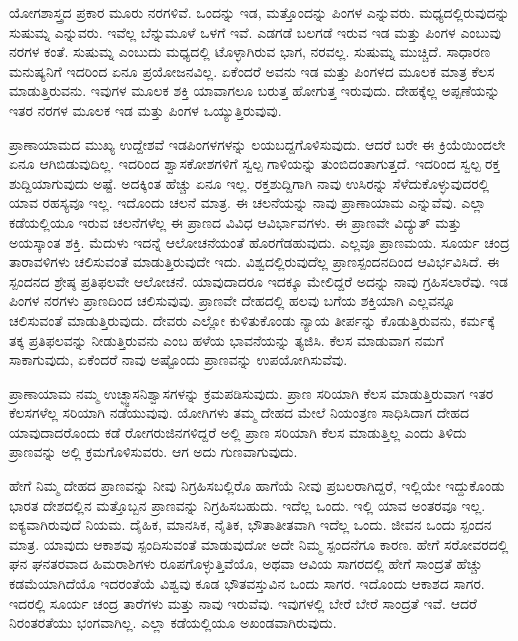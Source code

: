ಯೋಗಶಾಸ್ತ್ರದ ಪ್ರಕಾರ ಮೂರು ನರಗಳಿವೆ. ಒಂದನ್ನು ಇಡ, ಮತ್ತೊಂದನ್ನು ಪಿಂಗಳ ಎನ್ನುವರು. ಮಧ್ಯದಲ್ಲಿರುವುದನ್ನು ಸುಷುಮ್ನ ಎನ್ನುವರು. ಇವೆಲ್ಲ ಬೆನ್ನುಮೂಳೆ ಒಳಗೆ ಇವೆ. ಎಡಗಡೆ ಬಲಗಡೆ ಇರುವ ಇಡ ಮತ್ತು ಪಿಂಗಳ ಎಂಬುವು ನರಗಳ ಕಂತೆ. ಸುಷುಮ್ನ ಎಂಬುದು ಮಧ್ಯದಲ್ಲಿ ಟೊಳ್ಳಾಗಿರುವ ಭಾಗ, ನರವಲ್ಲ. ಸುಷುಮ್ನ ಮುಚ್ಚಿದೆ. ಸಾಧಾರಣ ಮನುಷ್ಯನಿಗೆ ಇದರಿಂದ ಏನೂ ಪ್ರಯೋಜನವಿಲ್ಲ. ಏಕೆಂದರೆ ಅವನು ಇಡ ಮತ್ತು ಪಿಂಗಳದ ಮೂಲಕ ಮಾತ್ರ ಕೆಲಸ ಮಾಡುತ್ತಿರುವನು. ಇವುಗಳ ಮೂಲಕ ಶಕ್ತಿ ಯಾವಾಗಲೂ ಬರುತ್ತ ಹೋಗುತ್ತ ಇರುವುದು. ದೇಹಕ್ಕೆಲ್ಲ ಅಪ್ಪಣೆಯನ್ನು ಇತರ ನರಗಳ ಮೂಲಕ ಇಡ ಮತ್ತು ಪಿಂಗಳ ಒಯ್ಯುತ್ತಿರುವುವು.

ಪ್ರಾಣಾಯಾಮದ ಮುಖ್ಯ ಉದ್ದೇಶವೆ ಇಡಪಿಂಗಳಗಳನ್ನು ಲಯಬದ್ದಗೊಳಿಸುವುದು. ಆದರೆ ಬರೇ ಈ ಕ್ರಿಯೆಯಿಂದಲೇ ಏನೂ ಆಗಿಬಿಡುವುದಿಲ್ಲ. ಇದರಿಂದ ಶ್ವಾಸಕೋಶಗಳಿಗೆ ಸ್ವಲ್ಪ ಗಾಳಿಯನ್ನು ತುಂಬಿದಂತಾಗುತ್ತದೆ. ಇದರಿಂದ ಸ್ವಲ್ಪ ರಕ್ತ ಶುದ್ದಿಯಾಗುವುದು ಅಷ್ಟೆ. ಅದಕ್ಕಿಂತ ಹೆಚ್ಚು ಏನೂ ಇಲ್ಲ. ರಕ್ತಶುದ್ದಿಗಾಗಿ ನಾವು ಉಸಿರನ್ನು ಸೆಳೆದುಕೊಳ್ಳುವುದರಲ್ಲಿ ಯಾವ ರಹಸ್ಯವೂ ಇಲ್ಲ. ಇದೊಂದು ಚಲನೆ ಮಾತ್ರ. ಈ ಚಲನೆಯನ್ನು ನಾವು ಪ್ರಾಣಾಯಾಮ ಎನ್ನುವೆವು. ಎಲ್ಲಾ ಕಡೆಯಲ್ಲಿಯೂ ಇರುವ ಚಲನೆಗಳೆಲ್ಲ ಈ ಪ್ರಾಣದ ವಿವಿಧ ಆವಿರ್ಭಾವಗಳು. ಈ ಪ್ರಾಣವೇ ವಿದ್ಯುತ್ ಮತ್ತು ಅಯಸ್ಕಾಂತ ಶಕ್ತಿ. ಮೆದುಳು ಇದನ್ನೆ ಆಲೋಚನೆಯಂತೆ ಹೊರಗೆಡಹುವುದು. ಎಲ್ಲವೂ ಪ್ರಾಣಮಯ. ಸೂರ್ಯ ಚಂದ್ರ ತಾರಾವಳಿಗಳು ಚಲಿಸುವಂತೆ ಮಾಡುತ್ತಿರುವುದೇ ಇದು. ವಿಶ್ವದಲ್ಲಿರುವುದೆಲ್ಲ ಪ್ರಾಣಸ್ಪಂದನದಿಂದ ಆವಿರ್ಭವಿಸಿದೆ. ಈ ಸ್ಪಂದನದ ಶ್ರೇಷ್ಠ ಪ್ರತಿಫಲವೇ ಆಲೋಚನೆ. ಯಾವುದಾದರೂ ಇದಕ್ಕೂ ಮೇಲಿದ್ದರೆ ಅದನ್ನು ನಾವು ಗ್ರಹಿಸಲಾರೆವು. ಇಡ ಪಿಂಗಳ ನರಗಳು ಪ್ರಾಣದಿಂದ ಚಲಿಸುವುವು. ಪ್ರಾಣವೇ ದೇಹದಲ್ಲಿ ಹಲವು ಬಗೆಯ ಶಕ್ತಿಯಾಗಿ ಎಲ್ಲವನ್ನೂ ಚಲಿಸುವಂತೆ ಮಾಡುತ್ತಿರುವುದು. ದೇವರು ಎಲ್ಲೋ ಕುಳಿತುಕೊಂಡು ನ್ಯಾಯ ತೀರ್ಪನ್ನು ಕೊಡುತ್ತಿರುವನು, ಕರ್ಮಕ್ಕೆ ತಕ್ಕ ಪ್ರತಿಫಲವನ್ನು ನೀಡುತ್ತಿರುವನು ಎಂಬ ಹಳೆಯ ಭಾವನೆಯನ್ನು ತ್ಯಜಿಸಿ. ಕೆಲಸ ಮಾಡುವಾಗ ನಮಗೆ ಸಾಕಾಗುವುದು, ಏಕೆಂದರೆ ನಾವು ಅಷ್ಟೊಂದು ಪ್ರಾಣವನ್ನು ಉಪಯೋಗಿಸುವೆವು.

ಪ್ರಾಣಾಯಾಮ ನಮ್ಮ ಉಚ್ಛ್ವಾಸನಿಶ್ವಾಸಗಳನ್ನು ಕ್ರಮಪಡಿಸುವುದು. ಪ್ರಾಣ ಸರಿಯಾಗಿ ಕೆಲಸ ಮಾಡುತ್ತಿರುವಾಗ ಇತರ ಕೆಲಸಗಳೆಲ್ಲ ಸರಿಯಾಗಿ ನಡೆಯುವುವು. ಯೋಗಿಗಳು ತಮ್ಮ ದೇಹದ ಮೇಲೆ ನಿಯಂತ್ರಣ ಸಾಧಿಸಿದಾಗ ದೇಹದ ಯಾವುದಾದರೊಂದು ಕಡೆ ರೋಗರುಜಿನಗಳಿದ್ದರೆ ಅಲ್ಲಿ ಪ್ರಾಣ ಸರಿಯಾಗಿ ಕೆಲಸ ಮಾಡುತ್ತಿಲ್ಲ ಎಂದು ತಿಳಿದು ಪ್ರಾಣವನ್ನು ಅಲ್ಲಿ ಕ್ರಮಗೊಳಿಸುವರು. ಆಗ ಅದು ಗುಣವಾಗುವುದು.

ಹೇಗೆ ನಿಮ್ಮ ದೇಹದ ಪ್ರಾಣವನ್ನು ನೀವು ನಿಗ್ರಹಿಸಬಲ್ಲಿರೊ ಹಾಗೆಯೆ ನೀವು ಪ್ರಬಲರಾಗಿದ್ದರೆ, ಇಲ್ಲಿಯೇ ಇದ್ದುಕೊಂಡು ಭಾರತ ದೇಶದಲ್ಲಿನ ಮತ್ತೊಬ್ಬನ ಪ್ರಾಣವನ್ನು ನಿಗ್ರಹಿಸಬಹುದು. ಇದೆಲ್ಲ ಒಂದು. ಇಲ್ಲಿ ಯಾವ ಅಂತರವೂ ಇಲ್ಲ. ಐಕ್ಯವಾಗಿರುವುದೆ ನಿಯಮ. ದೈಹಿಕ, ಮಾನಸಿಕ, ನೈತಿಕ, ಭೌತಾತೀತವಾಗಿ ಇದೆಲ್ಲ ಒಂದು. ಜೀವನ ಒಂದು ಸ್ಪಂದನ ಮಾತ್ರ. ಯಾವುದು ಆಕಾಶವು ಸ್ಪಂದಿಸುವಂತೆ ಮಾಡುವುದೋ ಅದೇ ನಿಮ್ಮ ಸ್ಪಂದನೆಗೂ ಕಾರಣ. ಹೇಗೆ ಸರೋವರದಲ್ಲಿ ಘನ ಘನತರವಾದ ಹಿಮರಾಶಿಗಳು ರೂಪಗೊಳ್ಳುತ್ತಿವೆಯೊ, ಅಥವಾ ಆವಿಯ ಸಾಗರದಲ್ಲಿ ಹೇಗೆ ಸಾಂದ್ರತೆ ಹೆಚ್ಚು ಕಡಮೆಯಾಗಿದೆಯೊ ಇದರಂತೆಯೆ ವಿಶ್ವವು ಕೂಡ ಭೌತವಸ್ತುವಿನ ಒಂದು ಸಾಗರ. ಇದೊಂದು ಆಕಾಶದ ಸಾಗರ. ಇದರಲ್ಲಿ ಸೂರ್ಯ ಚಂದ್ರ ತಾರೆಗಳು ಮತ್ತು ನಾವು ಇರುವೆವು. ಇವುಗಳಲ್ಲಿ ಬೇರೆ ಬೇರೆ ಸಾಂದ್ರತೆ ಇವೆ. ಆದರೆ ನಿರಂತರತೆಯು ಭಂಗವಾಗಿಲ್ಲ. ಎಲ್ಲಾ ಕಡೆಯಲ್ಲಿಯೂ ಅಖಂಡವಾಗಿರುವುದು.

